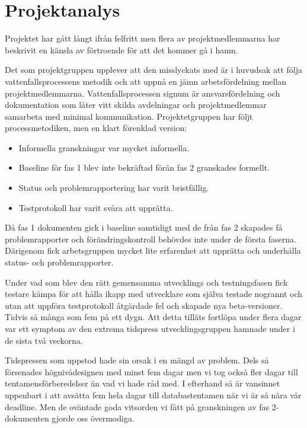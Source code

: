 \documentclass[paper=a4, fontsize=11pt,twoside]{article}
\begin{document}
\section{Projektanalys}
Projektet har gått långt ifrån felfritt men flera av projektmedlemmarna har 
beskrivit en känsla av förtroende för att det kommer gå i hamn.

Det som projektgruppen upplever att den misslyckats med är i huvudsak att följa 
vattenfallsprocessens metodik och att uppnå en jämn arbetsfördelning mellan 
projektmedlemmarna. Vattenfallsprocessen signum är ansvarsfördelning och dokumentation 
som låter vitt skilda avdelningar och projektmedlemmar samarbeta med minimal 
kommunikation. Projektetgruppen har följt processmetodiken, men en klart förenklad 
version:
\begin{itemize}
  \item Informella granskningar var mycket informella.
  \item Baseline för fas 1 blev inte bekräftad förän fas 2 granskades formellt.
  \item Status och problemrapportering har varit bristfällig.
  \item Testprotokoll har varit svåra att upprätta.
\end{itemize}

Då fas 1 dokumenten gick i baseline samtidigt med de från fas 2 skapades få 
problemrapporter och förändringskontroll behövdes inte under de första faserna. 
Därigenom fick arbetsgruppen mycket lite erfarenhet att upprätta och underhålla 
status- och problemrapporter.

Under vad som blev den rätt gemensamma utvecklings och testningsfasen fick 
testare kämpa för att hålla ikapp med utvecklare som själva testade nogrannt 
och utan att uppföra testprotokoll åtgärdade fel och skapade nya beta-versioner. 
Tidvis så många som fem på ett dygn. Att detta tilläts fortlöpa under 
flera dagar var ett symptom av den extrema tidspress utvecklingsgruppen hamnade 
under i de sista två veckorna.

Tidspressen som uppstod hade sin orsak i en mängd av problem. Dels så försenades 
högnivådesignen med minst fem dagar men vi tog också fler dagar till 
tentamensförberedelser än vad vi hade råd med. I efterhand så är vansinnet uppenbart 
i att avsätta fem hela dagar till databastentamen när vi är så nära vår deadline. 
Men de oväntade goda vitsorden vi fått på granskningen av fas 2-dokumenten gjorde oss 
övermodiga.\\
\end{document}
